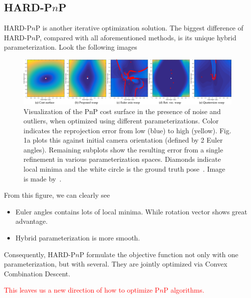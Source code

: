 \documentclass[a4paper]{report}
\begin{document}
\subsection{HARD-P$n$P}
HARD-P$n$P is another iterative optimization solution. The biggest difference of HARD-P$n$P, compared with all aforementioned methods, is its unique hybrid parameterization. Look the following images

\begin{figure}
\centering
\includegraphics[scale=0.14]{hand_eye_files/vision/figures/hadfi1-2806446-hires.png}
\caption{Visualization of the PnP cost surface in the presence of noise and outliers, when optimized using different parameterizations. Color indicates the reprojection error from low (blue) to high (yellow). Fig. 1a plots this against initial camera orientation (defined by 2 Euler angles). Remaining subplots show the resulting error from a single refinement in various parameterization spaces. Diamonds indicate local minima and the white circle is the ground truth pose~\cite{8292943}. Image is made by~\cite{8292943}.}
\end{figure}
From this figure, we can clearly see
\begin{itemize}
\item Euler angles contains lots of local minima. While rotation vector shows great advantage.
\item Hybrid parameterization is more smooth.
\end{itemize}
Consequently, HARD-P$n$P formulate the objective function not only with one parameterization, but with several. They are jointly optimized via Convex Combination Descent. 

\textcolor{red}{This leaves us a new direction of how to optimize P$n$P algorithms.}


 

\end{document}
